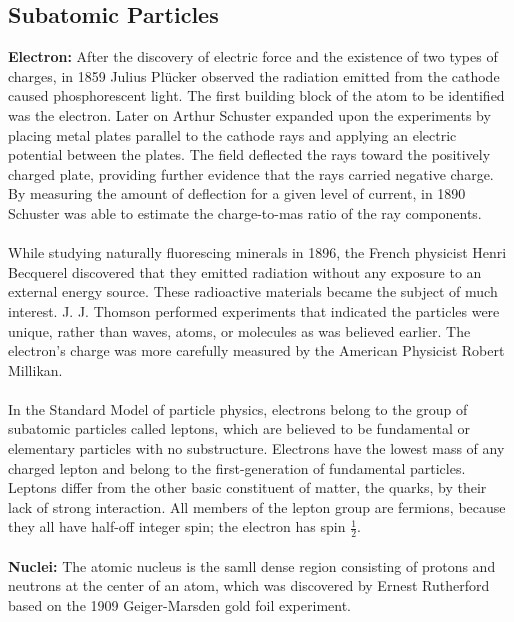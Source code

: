 \documentclass[10pt,a4paper]{article}
\begin{document}
\subsection{Subatomic Particles}
\textbf{Electron:}  After the discovery of electric force and the existence of two types of charges, in 1859 Julius Plücker observed the radiation emitted from the cathode caused phosphorescent light. The first building block of the atom to be identified was the electron. Later on Arthur Schuster expanded upon the experiments by placing metal plates parallel to the cathode rays and applying an electric potential between the plates. The field deflected the rays toward the positively charged plate, providing further evidence that the rays carried negative charge. By measuring the amount of deflection for a given level of current, in 1890 Schuster was able to estimate the charge-to-mas ratio of the ray components.
\\
\\
While studying naturally fluorescing minerals in 1896, the French physicist Henri Becquerel discovered that they emitted radiation without any exposure to an external energy source. These radioactive materials became the subject of much interest. J. J. Thomson performed experiments that indicated the particles were unique, rather than waves, atoms, or molecules as was believed earlier. The electron's charge was more carefully measured by the American Physicist Robert Millikan.
\\
\\
In the Standard Model of particle physics, electrons belong to the group of subatomic particles called leptons, which are believed to be fundamental or elementary particles with no substructure. Electrons have the lowest mass of any charged lepton and belong to the first-generation of fundamental particles. Leptons differ from the other basic constituent of matter, the quarks, by their lack of strong interaction. All members of the lepton group are fermions, because they all have half-off integer spin; the electron has spin $\frac12$.
\\
\\
\textbf{Nuclei:} The atomic nucleus is the samll dense region consisting of protons and neutrons at the center of an atom, which was discovered by Ernest Rutherford based on the 1909 Geiger-Marsden gold foil experiment.
\end{document}
